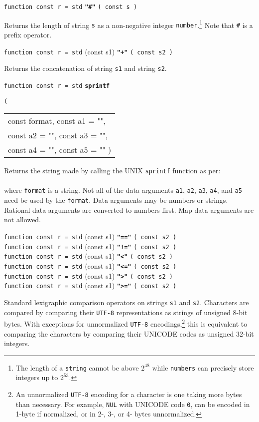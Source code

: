 \documentclass[12pt]{article}
\newcommand{\ttkey}[1]{{\tt \bfseries #1}}
\newenvironment{indpar}[1][0.3in]%
	{\begin{list}{}%
		     {\setlength{\itemsep}{0in}%
		      \setlength{\topsep}{0in}%
		      \setlength{\parsep}{1ex}%
		      \setlength{\labelwidth}{#1}%
		      \setlength{\leftmargin}{#1}%
		      \addtolength{\leftmargin}{\labelsep}}%
	 \item}%
	{\end{list}}
\begin{document}
{\tt function const r = std} \ttkey{"\#"} {\tt ( const s )}
\begin{indpar}
Returns the length of string {\tt s} as a non-negative integer
{\tt number}.\footnote{The length of a {\tt string} cannot
be above $2^{48}$ while
{\tt numbers} can precisely store integers up to $2^{53}$.}
Note that {\tt \#} is a prefix operator.
\end{indpar}

{\tt function const r = std} (const s1) \ttkey{"+"} {\tt ( const s2 )}
\begin{indpar}
Returns the concatenation of string {\tt s1}
and string {\tt s2}.
\end{indpar}

{\tt function const r = std} \ttkey{sprintf}
    {\tt ( \begin{tabular}[t]{@{}l}
            const format, const a1 = "", \\
	    const a2 = "", const a3 = "", \\
	    const a4 = "", const a5 = "" )
	    \end{tabular} }
\begin{indpar}
Returns the string made by calling the UNIX {\tt sprintf} function as per: \\
\hspace*{1in}{\tt sprintf ( format, a1, a2, a3, a4, a5 )} \\
where {\tt format} is a string.  Not all of the data arguments
{\tt a1}, {\tt a2}, {\tt a3}, {\tt a4}, and {\tt a5}
need be used by the {\tt format}.
Data arguments may be numbers or strings.
Rational data arguments are converted to numbers first.  Map data arguments
are not allowed.
\end{indpar}

{\tt function const r = std} (const s1) \ttkey{"=="} {\tt ( const s2 )} \\
{\tt function const r = std} (const s1) \ttkey{"!="} {\tt ( const s2 )} \\
{\tt function const r = std} (const s1) \ttkey{"<"} {\tt ( const s2 )} \\
{\tt function const r = std} (const s1) \ttkey{"<="} {\tt ( const s2 )} \\
{\tt function const r = std} (const s1) \ttkey{">"} {\tt ( const s2 )} \\
{\tt function const r = std} (const s1) \ttkey{">="} {\tt ( const s2 )}
\begin{indpar}
Standard lexigraphic comparison operators on strings {\tt s1} and {\tt s2}.
Characters are compared by comparing their {\tt UTF-8} representations
as strings of unsigned 8-bit bytes.  With exceptions for unnormalized
{\tt UTF-8} encodings,\footnote{
An unnormalized {\tt UTF-8} encoding for a character is one taking
more bytes than necessary.  For example, {\tt NUL} with UNICODE code {\tt 0},
can be encoded in 1-byte if normalized, or in 2-, 3-, or 4- bytes
unnormalized.}
this is equivalent to comparing the characters
by comparing their UNICODE codes as unsigned 32-bit integers.
\end{indpar}
\end{document}
